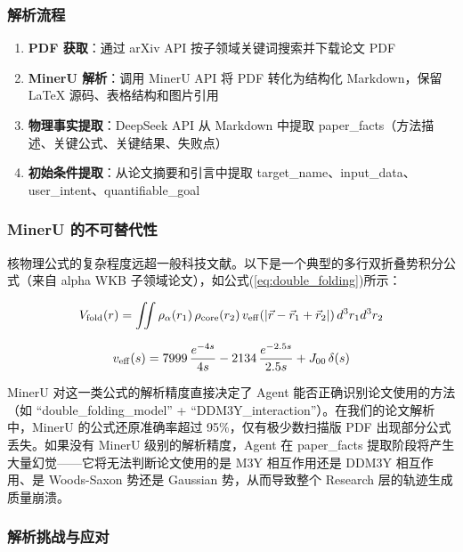 \documentclass[12pt,a4paper]{article}
\begin{document}
\subsubsection{解析流程}

\begin{enumerate}
\item \textbf{PDF 获取}：通过 arXiv API 按子领域关键词搜索并下载论文 PDF
\item \textbf{MinerU 解析}：调用 MinerU API 将 PDF 转化为结构化 Markdown，保留 LaTeX 源码、表格结构和图片引用
\item \textbf{物理事实提取}：DeepSeek API 从 Markdown 中提取 paper\_facts（方法描述、关键公式、关键结果、失败点）
\item \textbf{初始条件提取}：从论文摘要和引言中提取 target\_name、input\_data、user\_intent、quantifiable\_goal
\end{enumerate}

\subsubsection{MinerU 的不可替代性}

核物理公式的复杂程度远超一般科技文献。以下是一个典型的多行双折叠势积分公式（来自 alpha WKB 子领域论文），如公式(\ref{eq:double_folding})所示：

\begin{equation}
\label{eq:double_folding}
V_{\rm fold}(r) = \iint \rho_{\alpha}(r_1) \, \rho_{\rm core}(r_2) \, v_{\rm eff}(|\vec{r} - \vec{r}_1 + \vec{r}_2|) \, d^3r_1 d^3r_2
\end{equation}

\begin{equation}
v_{\rm eff}(s) = 7999\,\frac{e^{-4s}}{4s} - 2134\,\frac{e^{-2.5s}}{2.5s} + J_{00}\,\delta(s)
\end{equation}

MinerU 对这一类公式的解析精度直接决定了 Agent 能否正确识别论文使用的方法（如 “double\_folding\_model” + “DDM3Y\_interaction”）。在我们的论文解析中，MinerU 的公式还原准确率超过 95\%，仅有极少数扫描版 PDF 出现部分公式丢失。如果没有 MinerU 级别的解析精度，Agent 在 paper\_facts 提取阶段将产生大量幻觉——它将无法判断论文使用的是 M3Y 相互作用还是 DDM3Y 相互作用、是 Woods-Saxon 势还是 Gaussian 势，从而导致整个 Research 层的轨迹生成质量崩溃。

\subsubsection{解析挑战与应对}
\end{document}
